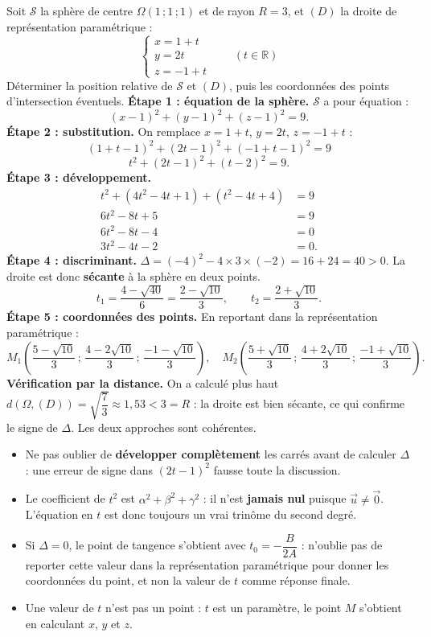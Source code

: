 \documentclass[11pt]{article}
\begin{document}
\begin{exoresolu}
Soit $\mathcal{S}$ la sphère de centre $\Omega(1\,;1\,;1)$ et de rayon $R=3$, et $(D)$ la droite de représentation paramétrique :
\[
\begin{cases} x = 1+t \\ y = 2t \\ z = -1+t \end{cases} \qquad (t\in\mathbb{R})
\]
Déterminer la position relative de $\mathcal{S}$ et $(D)$, puis les coordonnées des points d'intersection éventuels.
\tcblower
\textbf{Étape 1 : équation de la sphère.} $\mathcal{S}$ a pour équation :
\[
(x-1)^2+(y-1)^2+(z-1)^2=9.
\]
\textbf{Étape 2 : substitution.} On remplace $x=1+t$, $y=2t$, $z=-1+t$ :
\[
(1+t-1)^2+(2t-1)^2+(-1+t-1)^2=9
\]
\[
t^2+(2t-1)^2+(t-2)^2=9.
\]
\textbf{Étape 3 : développement.}
\begin{align*}
t^2+(4t^2-4t+1)+(t^2-4t+4) &= 9\\
6t^2-8t+5 &= 9\\
6t^2-8t-4 &= 0\\
3t^2-4t-2 &= 0.
\end{align*}
\textbf{Étape 4 : discriminant.} $\Delta=(-4)^2-4\times 3\times(-2)=16+24=40>0$. La droite est donc \textbf{sécante} à la sphère en deux points.
\[
t_1=\frac{4-\sqrt{40}}{6}=\frac{2-\sqrt{10}}{3}, \qquad t_2=\frac{2+\sqrt{10}}{3}.
\]
\textbf{Étape 5 : coordonnées des points.} En reportant dans la représentation paramétrique :
\[
M_1\left(\frac{5-\sqrt{10}}{3}\,;\,\frac{4-2\sqrt{10}}{3}\,;\,\frac{-1-\sqrt{10}}{3}\right), \quad
M_2\left(\frac{5+\sqrt{10}}{3}\,;\,\frac{4+2\sqrt{10}}{3}\,;\,\frac{-1+\sqrt{10}}{3}\right).
\]
\textbf{Vérification par la distance.} On a calculé plus haut $d(\Omega,(D))=\sqrt{\dfrac{7}{3}}\approx 1{,}53<3=R$ : la droite est bien sécante, ce qui confirme le signe de $\Delta$. Les deux approches sont cohérentes.
\end{exoresolu}

\begin{attention}
\begin{itemize}
\item Ne pas oublier de \textbf{développer complètement} les carrés avant de calculer $\Delta$ : une erreur de signe dans $(2t-1)^2$ fausse toute la discussion.
\item Le coefficient de $t^2$ est $\alpha^2+\beta^2+\gamma^2$ : il n'est \textbf{jamais nul} puisque $\vec{u}\neq\vec{0}$. L'équation en $t$ est donc toujours un vrai trinôme du second degré.
\item Si $\Delta=0$, le point de tangence s'obtient avec $t_0=-\dfrac{B}{2A}$ : n'oublie pas de reporter cette valeur dans la représentation paramétrique pour donner les coordonnées du point, et non la valeur de $t$ comme réponse finale.
\item Une valeur de $t$ n'est pas un point : $t$ est un paramètre, le point $M$ s'obtient en calculant $x$, $y$ et $z$.
\end{itemize}
\end{attention}
\end{document}
